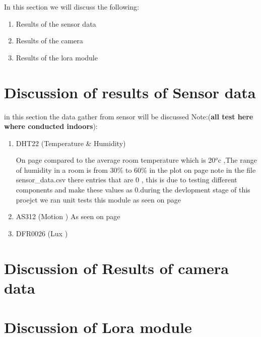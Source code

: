 In this section we will discuss the following:
\begin{enumerate}
    \item Results of the sensor data
    \item Results of the camera
    \item Results of the lora module
\end{enumerate}
\section{Discussion of results of Sensor data}
in this section the data gather from sensor will be discussed Note:(\textbf{all test here where conducted indoors}):
\begin{enumerate}
    \item DHT22 (Temperature \& Humidity)

    On page \pageref{Recorded data from  DHT22 on the 5th of march} compared to the average room temperature which is  20$^o$c ,The range of humidity in a room is from 30\% to 60\% in the plot on page \pageref{Temperature and Humidity plotted overtime} note in the file sensor_data.csv there entries  that are 0 , this is due to  testing different components and make these values as  0.during the devlopment stage of this proejct we ran unit tests  this module as seen on page \pageref{unit test message for DHT22 module}
    \item AS312 (Motion )
    As seen on page \pageref{}
    \item DFR0026 (Lux )
\end{enumerate}
\section{Discussion of Results of camera data}

\section{Discussion of Lora module}
\label{Discussion of Lora module}
